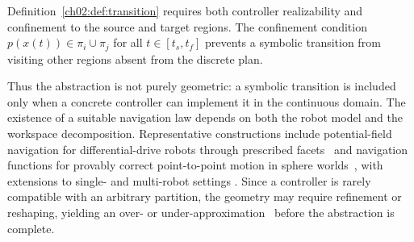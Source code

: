 \begin{revision}
Definition~\ref{ch02:def:transition} requires both controller realizability and
confinement to the source and target regions. The confinement condition
$p(x(t))\in\pi_i\cup\pi_j$ for all $t\in[t_s,t_f]$ prevents a symbolic
transition from visiting other regions absent from the discrete plan.
\end{revision} Thus the abstraction is not purely geometric: a symbolic transition is
included only when a concrete controller can implement it in the continuous
domain.
The existence of a suitable navigation law depends on both the robot model and
the workspace decomposition. Representative constructions include
potential-field navigation for differential-drive robots through prescribed
facets~\citep{lindemann2006real} and navigation functions for provably correct
point-to-point motion in sphere worlds~\citep{koditschek1990robot}, with
extensions to single- and multi-robot settings
\citep{loizou2008density,loizou2002closed,dimarogonas2007decentralized,
dimarogonas2005decentralized}. Since a controller is rarely compatible with an
arbitrary partition, the geometry may require refinement or reshaping, yielding
an over- or under-approximation~\citep{saidi1999abstract} before the
abstraction is complete.

